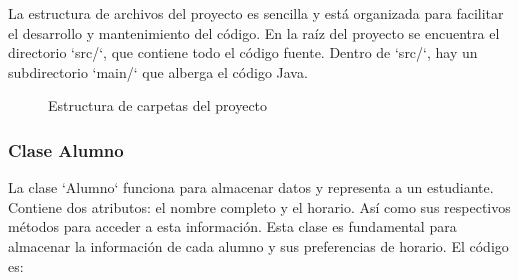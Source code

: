 La estructura de archivos del proyecto es sencilla y está organizada para facilitar el desarrollo y mantenimiento del código.
En la raíz del proyecto se encuentra el directorio `src/`, que contiene todo el código fuente.
Dentro de `src/`, hay un subdirectorio `main/` que alberga el código Java.

\vspace{0cm}
\begin{figure}[H]
    \centering
    \caption{Estructura de carpetas del proyecto}
    \vspace{-0.2cm}
    \label{fig:EstructuraCodigo}
\end{figure}

\subsubsection{Clase Alumno}
La clase `Alumno` funciona para almacenar datos y representa a un estudiante.
Contiene dos atributos: el nombre completo y el horario. Así como sus respectivos métodos para acceder a esta información.
Esta clase es fundamental para almacenar la información de cada alumno y sus preferencias de horario.
El código es:

